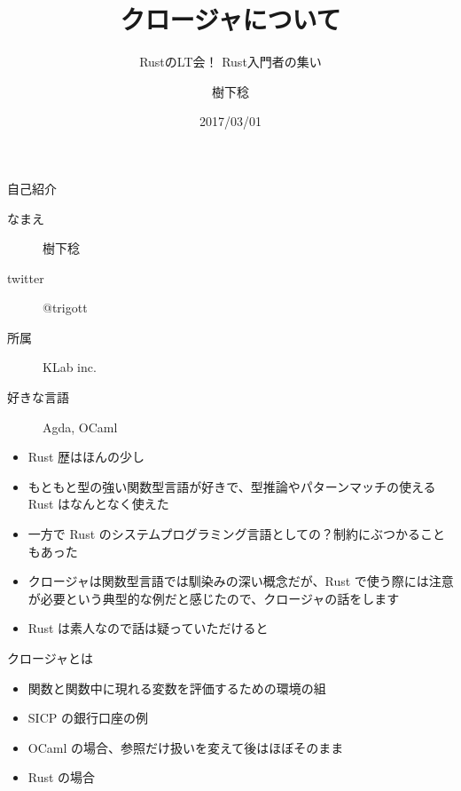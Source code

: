 \documentclass[dvipdfmx,11pt]{beamer}
\title{クロージャについて}
\subtitle{RustのLT会！ Rust入門者の集い}
\author{樹下稔}
\date{2017/03/01}
\begin{document}
\maketitle

\begin{frame}{自己紹介}
  \begin{description}
  \item[なまえ] 樹下稔
  \item[twitter] @trigott
  \item[所属] KLab inc.
  \item[好きな言語] Agda, OCaml
  \end{description}
\end{frame}

\begin{frame}
  \begin{itemize}
  \item Rust 歴はほんの少し
  \item もともと型の強い関数型言語が好きで、型推論やパターンマッチの使える Rust はなんとなく使えた
  \item 一方で Rust のシステムプログラミング言語としての？制約にぶつかることもあった
  \item クロージャは関数型言語では馴染みの深い概念だが、Rust で使う際には注意が必要という典型的な例だと感じたので、クロージャの話をします
  \item Rust は素人なので話は疑っていただけると
  \end{itemize}
\end{frame}

\begin{frame}[fragile]{クロージャとは}
  \begin{itemize}
  \item 関数と関数中に現れる変数を評価するための環境の組
  \item SICP の銀行口座の例
  \end{itemize}

  
\end{frame}

\begin{frame}[fragile]
  \begin{itemize}
  \item OCaml の場合、参照だけ扱いを変えて後はほぼそのまま
  \end{itemize}
  
\end{frame}

\begin{frame}[fragile]
  \begin{itemize}
  \item Rust の場合
  \end{itemize}
  
\end{frame}
\end{document}
